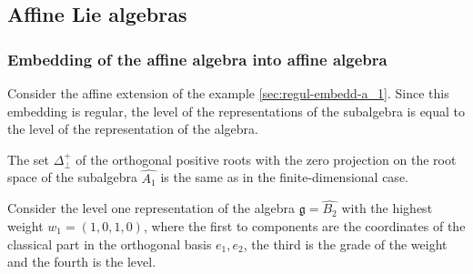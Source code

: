 \documentclass[a4paper,12pt]{article}
\theoremstyle{definition} \newtheorem{Def}{Definition}
\begin{document}
\subsection{Affine Lie algebras}
\label{sec:affine-lie-algebras}
\subsubsection{Embedding of the affine algebra into affine algebra}
\label{sec:embedd-affine-algebr}

Consider the affine extension of the example \ref{sec:regul-embedd-a_1}. 
Since this embedding is regular, the level of the representations of the subalgebra is equal to the level of the representation of the algebra. 

The set $\Delta^{+}_{\bot}$ of the orthogonal positive roots with the zero projection on the root space of the subalgebra $\hat{A_1}$ is the same as in the finite-dimensional case.

Consider the level one representation of the algebra $\mathfrak{g}=\hat{B_2}$ with the highest weight $w_1=(1,0,1,0)$, where the first to components are the coordinates of the classical part in the orthogonal basis $e_1,e_2$, the third is the grade of the weight and the fourth is the level.
\end{document}
